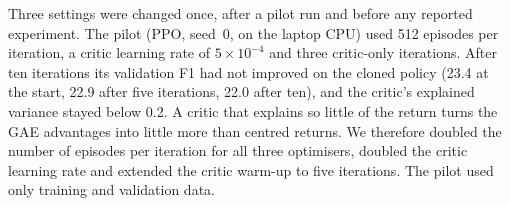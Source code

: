 Three settings were changed once, after a pilot run and before any reported experiment. The pilot (PPO, seed~0, on the laptop CPU) used 512 episodes per iteration, a critic learning rate of $5\times10^{-4}$ and three critic-only iterations. After ten iterations its validation F1 had not improved on the cloned policy (23.4 at the start, 22.9 after five iterations, 22.0 after ten), and the critic's explained variance stayed below 0.2. A critic that explains so little of the return turns the GAE advantages into little more than centred returns. We therefore doubled the number of episodes per iteration for all three optimisers, doubled the critic learning rate and extended the critic warm-up to five iterations. The pilot used only training and validation data.
